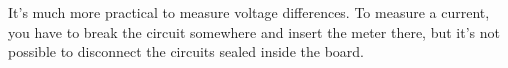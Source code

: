  It's much more practical to measure voltage differences.
To measure a current, you have to break the circuit
somewhere and insert the meter there, but it's not possible
to disconnect the circuits sealed inside the board.



